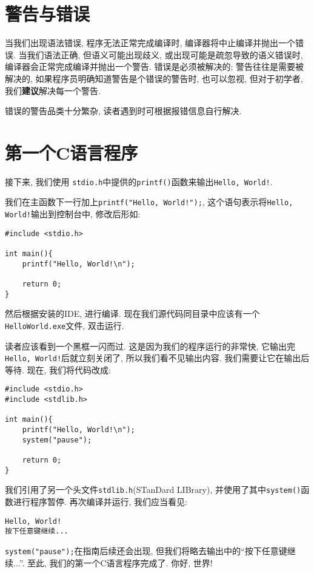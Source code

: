     \section{警告与错误} \label{警告与错误}
        当我们出现语法错误, 程序无法正常完成编译时, 编译器将中止编译并抛出一个错误. 当我们语法正确, 但语义可能出现歧义, 或出现可能是疏忽导致的语义错误时, 编译器会正常完成编译并抛出一个警告. 错误是必须被解决的; 警告往往是需要被解决的, 如果程序员明确知道警告是个错误的警告时, 也可以忽视, 但对于初学者, 我们\textbf{建议}解决每一个警告.

        错误的警告品类十分繁杂, 读者遇到时可根据报错信息自行解决.

    \section{第一个C语言程序} \label{第一个C语言程序}
        接下来, 我们使用 \texttt{stdio.h}中提供的\texttt{printf()}函数来输出\texttt{Hello, World!}.

        我们在主函数下一行加上\texttt{printf("Hello, World!");}, 这个语句表示将\texttt{Hello, World!}输出到控制台中, 修改后形如:
\begin{lstlisting}
#include <stdio.h>

int main(){
    printf("Hello, World!\n");

    return 0;
}
\end{lstlisting}

        然后根据安装的IDE, 进行编译. 现在我们源代码同目录中应该有一个\texttt{HelloWorld.exe}文件, 双击运行.

        读者应该看到一个黑框一闪而过. 这是因为我们的程序运行的非常快, 它输出完\texttt{Hello, World!}后就立刻关闭了, 所以我们看不见输出内容. 我们需要让它在输出后等待. 现在, 我们将代码改成:
\begin{lstlisting}
#include <stdio.h>
#include <stdlib.h>

int main(){
    printf("Hello, World!\n");
    system("pause");

    return 0;
}
\end{lstlisting}

        我们引用了另一个头文件\texttt{stdlib.h}(STanDard LIBrary), 并使用了其中\texttt{system()}函数进行程序暂停. 再次编译并运行, 我们应当看见:
\begin{lstlisting}
Hello, World!
按下任意键继续...
\end{lstlisting}

        \texttt{system("pause");}在指南后续还会出现, 但我们将略去输出中的``按下任意键继续...''. 至此, 我们的第一个C语言程序完成了. 你好, 世界!